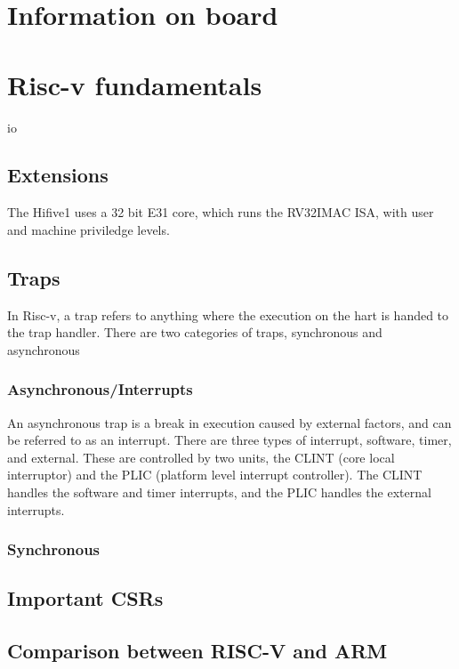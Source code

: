 \section{Information on board}
\section{Risc-v fundamentals}
\cite{riscv_unpriv}\cite{riscv_priv}\cite{sifive_manual}
\acrlong{io}
\subsection{Extensions}
The Hifive1 uses a 32 bit E31 core, which runs the RV32IMAC ISA, with user and machine priviledge levels. 
\subsection{Traps}
In Risc-v, a trap refers to anything where the execution on the hart is handed to the trap handler. There are two categories of traps, synchronous and asynchronous
\subsubsection{Asynchronous/Interrupts}
An asynchronous trap is a break in execution caused by external factors, and can be referred to as an interrupt. There are three types of interrupt, software, timer, and external. These are controlled by two units, the CLINT (core local interruptor) and the PLIC (platform level interrupt controller). The CLINT handles the software and timer interrupts, and the PLIC handles the external interrupts.
\subsubsection{Synchronous}
\subsection{Important CSRs}
\subsection{Comparison between RISC-V and ARM}